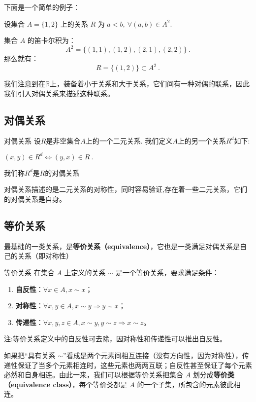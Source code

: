 下面是一个简单的例子：

\begin{example}{}
设集合 $A=\{1,2\}$ 上的关系 $R$ 为 $a<b,\ \forall (a,b)\in A^2$.

集合 $A$ 的笛卡尔积为：
\begin{equation}
A^2 = \{(1,1),(1,2),(2,1),(2,2)\}~.
\end{equation}
那么就有：
\begin{equation}
R=\{(1,2)\}\subset A^2~.
\end{equation}

\end{example}

我们注意到在$\mathbb{R}$上，装备着小于关系和大于关系，它们间有一种对偶的联系，因此我们引入对偶关系来描述这种联系。

\subsection{对偶关系}
\begin{definition}{对偶关系}
设$R$是非空集合$A$上的一个二元关系. 我们定义$A$上的另一个关系$R^{d}$如下:

$(x, y) \in R^{d} \Leftrightarrow(y, x) \in R~.$

我们称$R^{d}$是$R$的对偶关系

\end{definition}
对偶关系描述的是二元关系的对称性，同时容易验证,存在着一些二元关系，它们的对偶关系是自身。

\subsection{等价关系}\label{sub_Relat_1}
最基础的一类关系，是\textbf{等价关系（equivalence）}，它也是一类满足对偶关系是自己的关系（即对称性） 
\begin{definition}{等价关系}\label{def_Relat_1}
在集合 $A$ 上定义的关系 $\sim$ 是一个等价关系，要求满足条件：
\begin{enumerate}
\item \textbf{自反性}：$\forall x\in A, x\sim x$；
\item \textbf{对称性}：$\forall x, y\in A, x\sim y \Rightarrow y\sim x$；
\item \textbf{传递性}：$\forall x, y, z\in A, x\sim y, y\sim z\Rightarrow x\sim z$。
\end{enumerate}
注:等价关系定义中的自反性可去除，因对称性和传递性可以推出自反性。
\end{definition}
如果把“具有关系 $\sim$”看成是两个元素间相互连接（没有方向性，因为对称性），传递性保证了当多个元素相连时，这些元素也两两互联；自反性甚至保证了每个元素必然和自身相连。由此一来，我们可以根据等价关系把集合 $A$ 划分成\textbf{等价类（equivalence class）}，每个等价类都是 $A$ 的一个子集，所包含的元素彼此相连。

